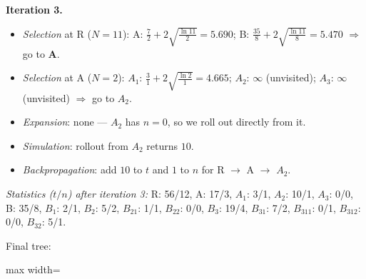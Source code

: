 \documentclass[11pt,a4paper]{article}
\begin{document}
\begin{solbox}
\smallskip
\textbf{Iteration 3.}
\begin{itemize}[leftmargin=1.5em,itemsep=1pt]
\item \emph{Selection} at R ($N=11$): A: $\frac{7}{2} + 2\sqrt{\frac{\ln 11}{2}} = 5.690$; B: $\frac{35}{8} + 2\sqrt{\frac{\ln 11}{8}} = 5.470$ $\Rightarrow$ go to \textbf{A}.
\item \emph{Selection} at A ($N=2$): $A_{1}$: $\frac{3}{1} + 2\sqrt{\frac{\ln 2}{1}} = 4.665$; $A_{2}$: $\infty$ (unvisited); $A_{3}$: $\infty$ (unvisited) $\Rightarrow$ go to \textbf{$A_{2}$}.
\item \emph{Expansion}: none --- \textbf{$A_{2}$} has $n=0$, so we roll out directly from it.
\item \emph{Simulation}: rollout from $A_{2}$ returns $10$.
\item \emph{Backpropagation}: add $10$ to $t$ and $1$ to $n$ for R $\to$ A $\to$ $A_{2}$.
\end{itemize}
\textit{Statistics ($t/n$) after iteration 3:} R: 56/12, A: 17/3, $A_{1}$: 3/1, $A_{2}$: 10/1, $A_{3}$: 0/0, B: 35/8, $B_{1}$: 2/1, $B_{2}$: 5/2, $B_{21}$: 1/1, $B_{22}$: 0/0, $B_{3}$: 19/4, $B_{31}$: 7/2, $B_{311}$: 0/1, $B_{312}$: 0/0, $B_{32}$: 5/1.\par Final tree:\begin{center}
\begin{adjustbox}{max width=\linewidth}
\end{adjustbox}
\end{center}
\end{solbox}
\end{document}
